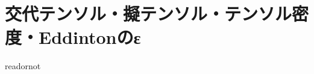 \documentclass{jsarticle}
\begin{document}
\fi

\section{交代テンソル・擬テンソル・テンソル密度・Eddintonのε}

\expandafter\ifx\csname readornot\endcsname\relax
  
\end{document}
